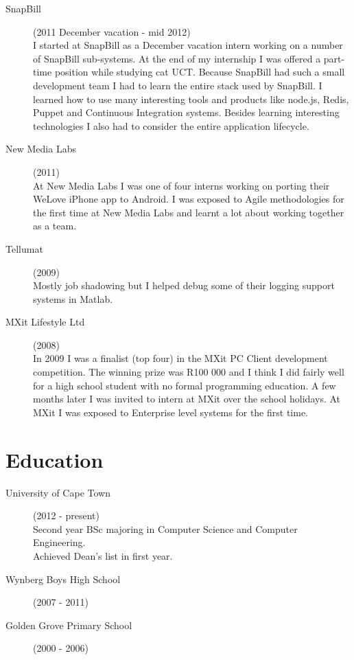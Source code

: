 \documentclass[margin,line,a4paper]{resume}
\begin{document}
\begin{resume}
\begin{description}
                \item[SnapBill] (2011 December vacation - mid 2012) \\
                    I started at SnapBill as a December vacation intern working on a number of SnapBill 
                    sub-systems. At the end of my internship I was offered a part-time position while studying 
                    cat UCT. Because SnapBill had such a small development team I had to learn the entire stack 
                    used by SnapBill. I learned how to use many interesting tools and products like node.js, 
                    Redis, Puppet and Continuous Integration systems. Besides learning interesting technologies 
                    I also had to consider the entire application lifecycle. 

                \item[New Media Labs] (2011) \\
                    At New Media Labs I was one of four interns working on porting their WeLove iPhone app to Android.
                    I was exposed to Agile methodologies for the first time at New Media Labs and learnt a lot about
                    working together as a team.

                \item[Tellumat] (2009) \\
                    Mostly job shadowing but I helped debug some of their logging support systems
                in Matlab.

                \item[MXit Lifestyle Ltd] (2008) \\
                    In 2009 I was a finalist (top four) in the MXit PC Client development competition. The winning 
                    prize was R100 000 and I think I did fairly well for a high school student with no formal 
                    programming education. A few months later I was invited to intern at MXit over the school 
                    holidays. At MXit I was exposed to Enterprise level systems for the first time.
            \end{description}

        \section{\mysidestyle Education}
            \begin{description}
                \item[University of Cape Town] (2012 - present) \\
                    Second year BSc majoring in Computer Science and Computer Engineering. \\
                    Achieved Dean's list in first year.
                \item[Wynberg Boys High School] (2007 - 2011)
                \item[Golden Grove Primary School] (2000 - 2006)
            \end{description}


\end{resume}
\end{document}
